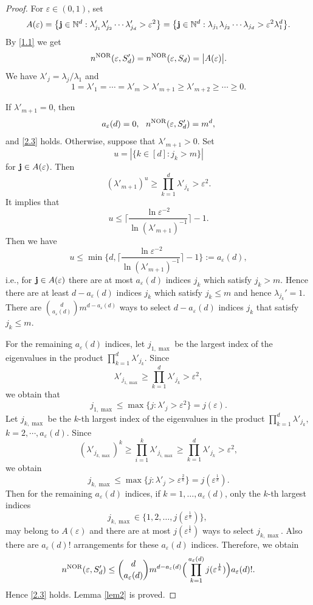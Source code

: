 \documentclass{amsart}
\numberwithin{equation}{section}
\def\vz{\varepsilon}
\def\lz{\lambda}
\newcommand{\NN}{\mathbb{N}}
\newcommand{\bsj}{\oldsymbol{j}}
\def\NN{{\mathbb N}}
\def\bsj{{\bf j}}
\begin{document}
\begin{proof}
For $\vz\in(0,1)$, set $$A(\vz)=\big\{\bsj \in \NN^d :
\lambda'_{j_1} \lambda'_{j_2}\cdots  \lambda'_{j_d}> \varepsilon^2
\big\}=\big\{\bsj \in \NN^d : \lambda_{j_1} \lambda_{j_2}\cdots
\lambda_{j_d}> \varepsilon^2 \lz_1^{d}\big\}.$$ By \eqref{1.1}
we get
$$n^{\rm NOR}(\vz,S'_d)=n^{\rm NOR}(\vz,S_d)= \big|A(\vz)\big|.$$
 We have $\lz'_j=\lz_j/\lz_1$ and
$$1=\lz'_1=\cdots=\lz'_m>\lz'_{m+1}\ge\lz'_{m+2}\ge\cdots\ge0.$$

If $\lz'_{m+1}=0$, then $$a_{\vz}(d)=0, \ \ n^{\rm
NOR}(\vz,S'_d)=m^d,$$ and \eqref{2.3} holds. Otherwise, suppose
that $\lz'_{m+1}>0$. Set $$u=|\{k\in [d] : j_k>m\}|$$ for $\bsj\in
A(\vz)$. Then
$$(\lz'_{m+1})^{u} \ge\prod_{k=1}^d\lambda'_{j_k}>\vz^2.$$
It implies that
$$u\le \big\lceil\frac{\ln\vz^{-2}}{\ln(\lambda'_{m+1})^{-1}}\big\rceil-1.$$
Then we have
\begin{equation*}
u\le \min\big\{d,
\big\lceil\frac{\ln\vz^{-2}}{\ln(\lambda'_{m+1})^{-1}}\big\rceil-1\big\}:=a_{\vz}(d),
\end{equation*}i.e., for $\bsj\in
A(\vz)$ there are at most $a_{\vz}(d)$ indices $j_k$ which satisfy
$j_k>m$. Hence there are at least $d-a_{\vz}(d)$ indices $j_k$
which satisfy $j_k\le m$ and hence $\lz_{j_k}'=1$.  There are
$\binom{d}{a_{\vz}(d)}m^{d-a_{\vz}(d)}$ ways to select $d-a_{\vz}(d)$
indices $j_k$ that satisfy $j_k\le m$.

For the remaining $a_{\vz}(d)$ indices, let $j_{1,\max}$ be the
largest index of the eigenvalues in the product
$\prod\limits_{k=1}^d\lambda'_{j_k}$. Since
$$\lambda'_{j_{1,\max}}\ge   \prod\limits_{k=1}^d\lambda'_{j_k}>\vz^2,$$
we obtain that
$$j_{1,\max}\le \max\big\{j:\lambda'_j>{\vz^2}\big\}
=j(\vz).$$ Let $j_{k,\max}$ be the $k$-th largest index of the
eigenvalues in the product $\prod\limits_{k=1}^d\lambda'_{j_k},$
$k=2,\cdots,a_\vz(d)$. Since
$$ (\lambda'_{j_{k,\max}})^k\ge \prod_{i=1}^k \lambda'_{j_{i,\max}}\ge  \prod_{k=1}^d\lambda'_{j_k}
>\vz^2,$$
we obtain
\begin{equation*}
j_{k,\max}\le \max\big\{j:\lambda'_j>\vz^{\frac{2}{k}}\big\} =j(\vz^{\frac{1}{k}})
.
\end{equation*}
Then for the remaining $a_{\vz}(d)$ indices, if $k=1,\dots,
a_\vz(d)$, only the $k$-th largest indices
$$j_{k,\max}\in\big\{1, 2, \dots, j(\vz^{\frac{1}{k}})\big\},\
$$ may belong to $A(\vz)$ and there are at most $j(\vz^{\frac{1}{k}})$ ways to select $j_{k,\max}$.
Also there are  $a_{\vz}(d)!$ arrangements for these $a_{\vz}(d)$
indices. Therefore, we obtain
$$n^{\rm NOR}(\vz,S_d')\le
\binom{d}{a_{\vz}(d)}m^{d-a_{\vz}(d)}
\Big(\prod_{k=1}^{a_{\vz}(d)}j(\vz^{\frac{1}{k}})\Big)
a_{\vz}(d)!.
$$
Hence \eqref{2.3} holds. Lemma \ref{lem2} is proved.
\end{proof}
\end{document}
